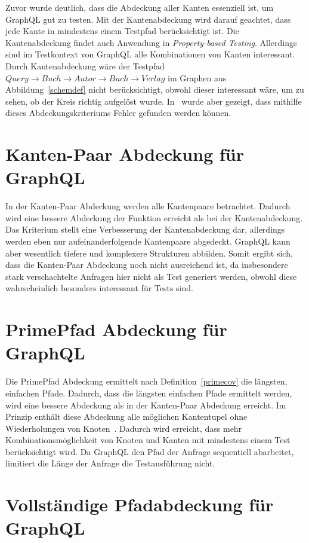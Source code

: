 Zuvor wurde deutlich, dass die Abdeckung aller Kanten essenziell ist, um GraphQL gut zu testen.
Mit der Kantenabdeckung wird darauf geachtet, dass jede Kante in mindestens einem Testpfad berücksichtigt ist.
Die Kantenabdeckung findet auch Anwendung in \textit{Property-based Testing}\cite[vgl. D-RQ1 ]{property-based-testing}.
Allerdings sind im Testkontext von GraphQL alle Kombinationen von Kanten interessant.
Durch Kantenabdeckung wäre der Testpfad $Query \rightarrow Buch \rightarrow Autor \rightarrow Buch \rightarrow Verlag$
im Graphen aus Abbildung~\ref{schemdef} nicht berücksichtigt, obwohl dieser interessant wäre, um zu sehen, ob der Kreis richtig aufgelöst wurde.
In~\cite{property-based-testing} wurde aber gezeigt, dass mithilfe dieses Abdeckungskriteriums Fehler gefunden werden können.

\section{Kanten-Paar Abdeckung für GraphQL}

In der Kanten-Paar Abdeckung werden alle Kantenpaare betrachtet.
Dadurch wird eine bessere Abdeckung der Funktion erreicht als bei der Kantenabdeckung.
Das Kriterium stellt eine Verbesserung der Kantenabdeckung dar, allerdings werden eben nur aufeinanderfolgende Kantenpaare abgedeckt.
GraphQL kann aber wesentlich tiefere und komplexere Strukturen abbilden.
Somit ergibt sich, dass die Kanten-Paar Abdeckung noch nicht ausreichend ist, da insbesondere stark verschachtelte Anfragen hier nicht als Test generiert werden,
obwohl diese wahrscheinlich besonders interessant für Tests sind.

\section{PrimePfad Abdeckung für GraphQL}

Die PrimePfad Abdeckung ermittelt nach Definition~\ref{primecov} die längsten, einfachen Pfade.
Dadurch, dass die längsten einfachen Pfade ermittelt werden, wird eine bessere Abdeckung als in der Kanten-Paar Abdeckung erreicht.
Im Prinzip enthält diese Abdeckung alle möglichen Kantentupel ohne Wiederholungen von Knoten~\cite[vgl. S. 42]{software-testing}.
Dadurch wird erreicht, dass mehr Kombinationsmöglichkeit von Knoten und Kanten mit mindestens einem Test berücksichtigt wird.
Da GraphQL den Pfad der Anfrage sequentiell abarbeitet, limitiert die Länge der Anfrage die Testausführung nicht.

\section{Vollständige Pfadabdeckung für GraphQL}

